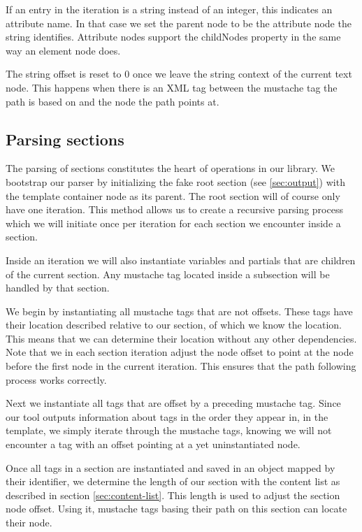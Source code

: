 \documentclass[thesis.tex]{subfiles}
\begin{document}
If an entry in the iteration is a string instead of an integer, this indicates
an attribute name. In that case we set the parent node to be the attribute node
the string identifies.
Attribute nodes support the childNodes property in the same way an element node
does.

The string offset is reset to 0 once we leave the string context of the
current text node. This happens when there is an XML tag between the
mustache tag the path is based on and the node the path points at.

\subsection{Parsing sections}
The parsing of sections constitutes the heart of operations in our library.
We bootstrap our parser by initializing the fake root section
(see \ref{sec:output}) with the template container node as its parent.
The root section will of course only have one iteration.
This method allows us to create a recursive parsing process which we will
initiate once per iteration for each section we encounter inside a section.

Inside an iteration we will also instantiate variables and partials that are
children of the current section. Any mustache tag located inside a subsection
will be handled by that section.

We begin by instantiating all mustache tags that are not offsets. These
tags have their location described relative to our section, of which we know the
location. This means that we can determine their location without any other
dependencies.
Note that we in each section iteration adjust the node offset
to point at the node before the first node in the current iteration.
This ensures that the path following process works correctly.

Next we instantiate all tags that are offset by a preceding mustache tag.
Since our tool outputs information about tags in the order they appear in, in the
template, we simply iterate through the mustache tags, knowing we will not
encounter a tag with an offset pointing at a yet uninstantiated node.


Once all tags in a section are instantiated and saved in an object mapped by
their identifier, we determine the length of our section with the content list
as described in section \ref{sec:content-list}. This length is used to adjust
the section node offset. Using it, mustache tags basing their path on this
section can locate their node.
\end{document}
